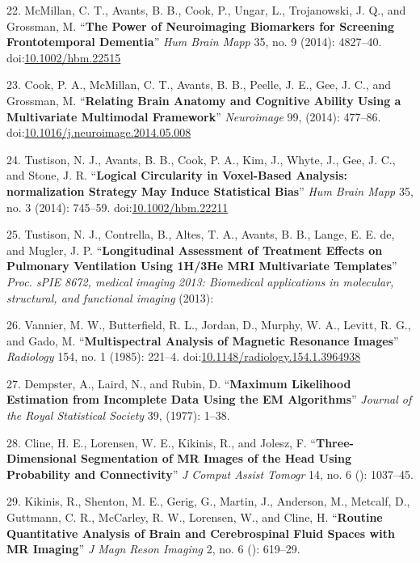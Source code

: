 \documentclass[11pt,]{article}
\begin{document}
22. McMillan, C. T., Avants, B. B., Cook, P., Ungar, L., Trojanowski, J.
Q., and Grossman, M. ``\textbf{The Power of Neuroimaging Biomarkers for
Screening Frontotemporal Dementia}'' \emph{Hum Brain Mapp} 35, no. 9
(2014): 4827--40.
doi:\href{http://dx.doi.org/10.1002/hbm.22515}{10.1002/hbm.22515}

23. Cook, P. A., McMillan, C. T., Avants, B. B., Peelle, J. E., Gee, J.
C., and Grossman, M. ``\textbf{Relating Brain Anatomy and Cognitive
Ability Using a Multivariate Multimodal Framework}'' \emph{Neuroimage}
99, (2014): 477--86.
doi:\href{http://dx.doi.org/10.1016/j.neuroimage.2014.05.008}{10.1016/j.neuroimage.2014.05.008}

24. Tustison, N. J., Avants, B. B., Cook, P. A., Kim, J., Whyte, J.,
Gee, J. C., and Stone, J. R. ``\textbf{Logical Circularity in
Voxel-Based Analysis: normalization Strategy May Induce Statistical
Bias}'' \emph{Hum Brain Mapp} 35, no. 3 (2014): 745--59.
doi:\href{http://dx.doi.org/10.1002/hbm.22211}{10.1002/hbm.22211}

25. Tustison, N. J., Contrella, B., Altes, T. A., Avants, B. B., Lange,
E. E. de, and Mugler, J. P. ``\textbf{Longitudinal Assessment of
Treatment Effects on Pulmonary Ventilation Using 1H/3He MRI Multivariate
Templates}'' \emph{Proc. sPIE 8672, medical imaging 2013: Biomedical
applications in molecular, structural, and functional imaging} (2013):

26. Vannier, M. W., Butterfield, R. L., Jordan, D., Murphy, W. A.,
Levitt, R. G., and Gado, M. ``\textbf{Multispectral Analysis of Magnetic
Resonance Images}'' \emph{Radiology} 154, no. 1 (1985): 221--4.
doi:\href{http://dx.doi.org/10.1148/radiology.154.1.3964938}{10.1148/radiology.154.1.3964938}

27. Dempster, A., Laird, N., and Rubin, D. ``\textbf{Maximum Likelihood
Estimation from Incomplete Data Using the EM Algorithms}'' \emph{Journal
of the Royal Statistical Society} 39, (1977): 1--38.

28. Cline, H. E., Lorensen, W. E., Kikinis, R., and Jolesz, F.
``\textbf{Three-Dimensional Segmentation of MR Images of the Head Using
Probability and Connectivity}'' \emph{J Comput Assist Tomogr} 14, no. 6
(): 1037--45.

29. Kikinis, R., Shenton, M. E., Gerig, G., Martin, J., Anderson, M.,
Metcalf, D., Guttmann, C. R., McCarley, R. W., Lorensen, W., and Cline,
H. ``\textbf{Routine Quantitative Analysis of Brain and Cerebrospinal
Fluid Spaces with MR Imaging}'' \emph{J Magn Reson Imaging} 2, no. 6 ():
619--29.
\end{document}
